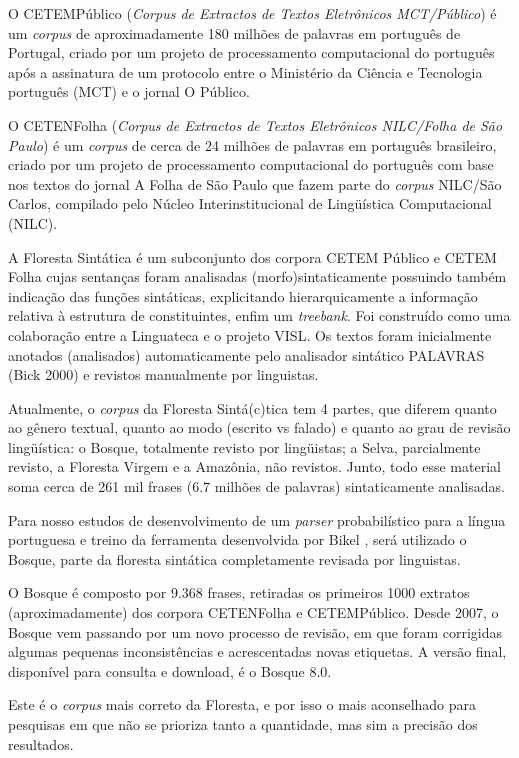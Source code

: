 O CETEMPúblico (\emph{Corpus de Extractos de Textos Eletrônicos MCT/Público}) é um \emph{corpus} de aproximadamente 180 milhões de palavras em português de Portugal, criado por um projeto de processamento computacional do português após a assinatura de um protocolo entre o Ministério da Ciência e Tecnologia português (MCT) e o jornal O Público.

O CETENFolha (\emph{Corpus de Extractos de Textos Eletrônicos NILC/Folha de São Paulo}) é um \emph{corpus} de cerca de 24 milhões de palavras em português brasileiro, criado por um projeto de processamento computacional do português com base nos textos do jornal A Folha de São Paulo que fazem parte do \emph{corpus} NILC/São Carlos, compilado pelo Núcleo Interinstitucional de Lingüística Computacional (NILC).

A Floresta Sintática é um subconjunto dos corpora CETEM Público e CETEM Folha cujas sentanças foram analisadas (morfo)sintaticamente possuindo também indicação das funções sintáticas, explicitando hierarquicamente a informação relativa à estrutura de constituintes, enfim um \emph{treebank}. Foi construído como uma colaboração entre a Linguateca e o projeto VISL. Os textos foram inicialmente anotados (analisados) automaticamente pelo analisador sintático PALAVRAS (Bick 2000) e revistos manualmente por linguistas.

Atualmente, o \emph{corpus} da Floresta Sintá(c)tica tem 4 partes, que diferem quanto ao gênero textual, quanto ao modo (escrito vs falado) e quanto ao grau de revisão lingüística: o Bosque, totalmente revisto por lingüistas; a Selva, parcialmente revisto, a Floresta Virgem e a Amazônia, não revistos. Junto, todo esse material soma cerca de 261 mil frases (6.7 milhões de palavras) sintaticamente analisadas.

Para nosso estudos de desenvolvimento de um \emph{parser} probabilístico para a língua portuguesa e treino da ferramenta desenvolvida por Bikel , será utilizado o Bosque, parte da floresta sintática completamente revisada por linguistas.

O Bosque é composto por 9.368 frases, retiradas os primeiros 1000 extratos (aproximadamente) dos corpora CETENFolha e CETEMPúblico. Desde 2007, o Bosque vem passando por um novo processo de revisão, em que foram corrigidas algumas pequenas inconsistências e acrescentadas novas etiquetas. A versão final, disponível para consulta e download, é o Bosque 8.0.

Este é o \emph{corpus} mais correto da Floresta, e por isso o mais aconselhado para pesquisas em que não se prioriza tanto a quantidade, mas sim a precisão dos resultados.

